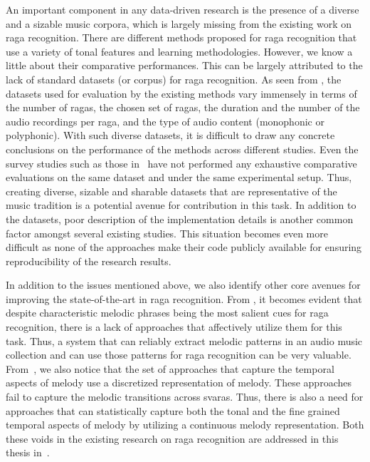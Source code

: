 An important component in any data-driven research is the presence of a diverse and a sizable music corpora, which is largely missing from the existing work on \gls{raga} recognition. There are different methods proposed for \gls{raga} recognition that use a variety of tonal features and learning methodologies. However, we know a little about their comparative performances. This can be largely attributed to the lack of standard datasets (or corpus) for \gls{raga} recognition. As seen from , the datasets used for evaluation by the existing methods vary immensely in terms of the number of \glspl{raga}, the chosen set of \glspl{raga}, the duration and the number of the audio recordings per \gls{raga}, and the type of audio content (monophonic or polyphonic). With such diverse datasets, it is difficult to draw any concrete conclusions on the performance of the methods across different studies. Even the survey studies such as those in~\cite{koduri2011survey} have not performed any exhaustive comparative evaluations on the same dataset and under the same experimental setup. Thus, creating diverse, sizable and sharable datasets that are representative of the music tradition is a potential avenue for contribution in this task. In addition to the datasets, poor description of the implementation details is another common factor amongst several existing studies. This situation becomes even more difficult as none of the approaches make their code publicly available for ensuring reproducibility of the research results. 


In addition to the issues mentioned above, we also identify other core avenues for improving the state-of-the-art in \gls{raga} recognition. From , it becomes evident that despite characteristic melodic phrases being the most salient cues for \gls{raga} recognition, there is a lack of approaches that affectively utilize them for this task. Thus, a system that can reliably extract melodic patterns in an audio music collection and can use those patterns for \gls{raga} recognition can be very valuable. From~, we also notice that the set of approaches that capture the temporal aspects of melody use a discretized representation of melody. These approaches fail to capture the melodic transitions across \glspl{svara}. Thus, there is also a need for approaches that can statistically capture both the tonal and the fine grained temporal aspects of melody by utilizing a continuous melody representation. Both these voids in the existing research on \gls{raga} recognition are addressed in this thesis in~.



